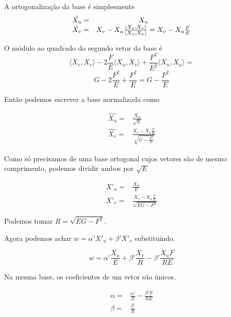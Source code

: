 \documentclass{article}
\begin{document}
A ortogonalização da base é simplesmente 
\begin{equation*}
    \begin{array}{cc}
        \Tilde{X_u} = & X_u \\
        \Tilde{X_v} = & X_v - X_u \frac{\langle X_u, X_v \rangle}{\langle X_u, X_u \rangle} = X_v - X_u \frac{F}{E}
    \end{array}
\end{equation*}

O módulo ao quadrado do segundo vetor da base é 
\[\langle X_v, X_v \rangle - 2\frac{F}{E} \langle X_u, X_v \rangle + \frac{F^2}{E^2} \langle X_u, X_u \rangle = \]
\[ G - 2\frac{F^2}{E} + \frac{F^2}{E} = G - \frac{F^2}{E}\]

Então podemos escrever a base normalizada como 

\begin{equation*}
    \begin{array}{cc}
        \hat{X_u} = & \frac{X_u}{\sqrt{E}} \\
        \hat{X_v} = & \frac{X_v - X_u \frac{F}{E}}{\sqrt{G-\frac{F^2}{E}}}
    \end{array}
\end{equation*}

Como só precisamos de uma base ortogonal cujos vetores são de mesmo comprimento, podemos dividir ambos por $\sqrt{E}$

\begin{equation*}
\begin{array}{cc}
        X'_u = & \frac{X_u}{E} \\
        X'_v = & \frac{X_v - X_u \frac{F}{E}}{\sqrt{EG-F^2}}
    \end{array}
\end{equation*}

Podemos tomar $R = \sqrt{EG-F^2}$.

Agora podemos achar $w = \alpha' X'_u + \beta' X'_v$ substituindo.

\[w = \alpha' \frac{X_u}{E} + \beta' \frac{X_v}{R} - \beta' \frac{X_u F}{RE}\]

Na mesma base, os coeficientes de um vetor são únicos.

\begin{equation*}
    \begin{array}{cc}
        \alpha = & \frac{\alpha'}{E} - \frac{\beta' F}{RE}  \\
        \beta  = & \frac{\beta'}{R}
    \end{array}
\end{equation*}
\end{document}
